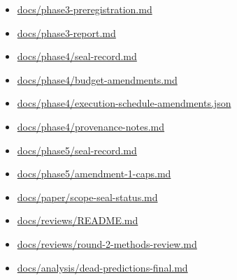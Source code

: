 \documentclass[11pt]{article}
\providecommand{\tightlist}{\setlength{\itemsep}{0pt}\setlength{\parskip}{0pt}}
\begin{document}
\begin{itemize}
\tightlist
\item
  \href{https://github.com/yoheinakajima/synthetic-players/blob/62ab90beff1d291b069c87f13b6b6b3495171ddd/docs/phase3-preregistration.md}{docs/phase3-preregistration.md}
\item
  \href{https://github.com/yoheinakajima/synthetic-players/blob/62ab90beff1d291b069c87f13b6b6b3495171ddd/docs/phase3-report.md}{docs/phase3-report.md}
\item
  \href{https://github.com/yoheinakajima/synthetic-players/blob/62ab90beff1d291b069c87f13b6b6b3495171ddd/docs/phase4/seal-record.md}{docs/phase4/seal-record.md}
\item
  \href{https://github.com/yoheinakajima/synthetic-players/blob/62ab90beff1d291b069c87f13b6b6b3495171ddd/docs/phase4/budget-amendments.md}{docs/phase4/budget-amendments.md}
\item
  \href{https://github.com/yoheinakajima/synthetic-players/blob/62ab90beff1d291b069c87f13b6b6b3495171ddd/docs/phase4/execution-schedule-amendments.json}{docs/phase4/execution-schedule-amendments.json}
\item
  \href{https://github.com/yoheinakajima/synthetic-players/blob/62ab90beff1d291b069c87f13b6b6b3495171ddd/docs/phase4/provenance-notes.md}{docs/phase4/provenance-notes.md}
\item
  \href{https://github.com/yoheinakajima/synthetic-players/blob/62ab90beff1d291b069c87f13b6b6b3495171ddd/docs/phase5/seal-record.md}{docs/phase5/seal-record.md}
\item
  \href{https://github.com/yoheinakajima/synthetic-players/blob/62ab90beff1d291b069c87f13b6b6b3495171ddd/docs/phase5/amendment-1-caps.md}{docs/phase5/amendment-1-caps.md}
\item
  \href{https://github.com/yoheinakajima/synthetic-players/blob/62ab90beff1d291b069c87f13b6b6b3495171ddd/docs/paper/scope-seal-status.md}{docs/paper/scope-seal-status.md}
\item
  \href{https://github.com/yoheinakajima/synthetic-players/blob/62ab90beff1d291b069c87f13b6b6b3495171ddd/docs/reviews/README.md}{docs/reviews/README.md}
\item
  \href{https://github.com/yoheinakajima/synthetic-players/blob/62ab90beff1d291b069c87f13b6b6b3495171ddd/docs/reviews/round-2-methods-review.md}{docs/reviews/round-2-methods-review.md}
\item
  \href{https://github.com/yoheinakajima/synthetic-players/blob/62ab90beff1d291b069c87f13b6b6b3495171ddd/docs/analysis/dead-predictions-final.md}{docs/analysis/dead-predictions-final.md}

\end{itemize}
\end{document}
